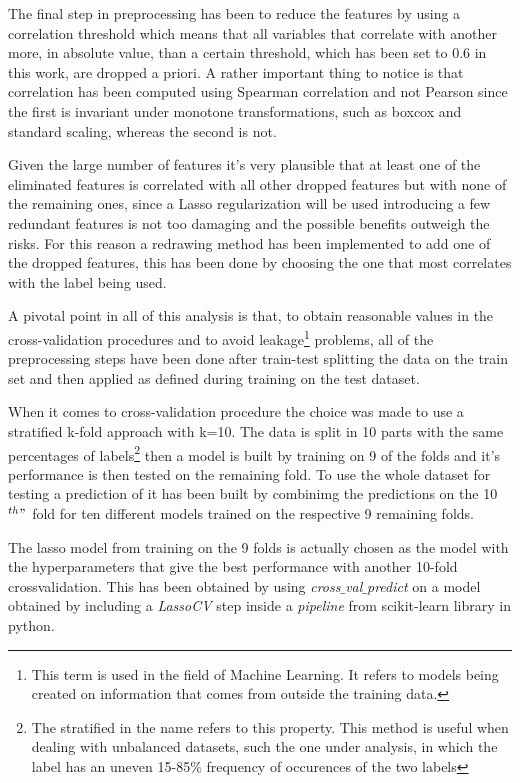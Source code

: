 The final step in preprocessing has been to reduce the features by using a correlation threshold which means that all variables that correlate with another more, in absolute value, than a certain threshold, which has been set to 0.6 in this work, are dropped a priori. A rather important thing to notice is that correlation has been computed using Spearman correlation and not Pearson since the first is invariant under monotone transformations, such as boxcox and standard scaling, whereas the second is not.

Given the large number of features it's very plausible that at least one of the eliminated features is correlated with all other dropped features but with none of the remaining ones, since a Lasso regularization will be used introducing a few redundant features is not too damaging and the possible benefits outweigh the risks. For this reason a redrawing method has been implemented to add one of the dropped features, this has been done by choosing the one that most correlates with the label being used.

A pivotal point in all of this analysis is that, to obtain reasonable values in the cross-validation procedures and to avoid leakage\footnote{This term is used in the field of Machine Learning. It refers to models being created on information that comes from outside the training data.} problems, all of the preprocessing steps have been done after train-test splitting the data on the train set and then applied as defined during training on the test dataset.

When it comes to cross-validation procedure the choice was made to use a stratified k-fold approach with k=10. The data is split in 10 parts with the same percentages of labels\footnote{The stratified in the name refers to this property. This method is useful when dealing with unbalanced datasets, such the one under analysis, in which the label has an uneven 15-85$\%$ frequency of occurences of the two labels} then a model is built by training on 9 of the folds and it's performance is then tested on the remaining fold. To use the whole dataset for testing a prediction of it has been built by combinimg the predictions on the 10$^{th}"$ fold for ten different models trained on the respective 9 remaining folds.

The lasso model from training on the 9 folds is actually chosen as the model with the hyperparameters that give the best performance with another 10-fold crossvalidation. This has been obtained by using \textit{cross$\_$val$\_$predict} on a model obtained by including a \textit{LassoCV} step inside a \textit{pipeline} from scikit-learn library in python. 

